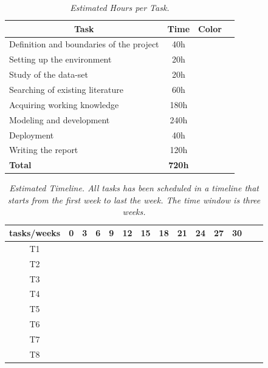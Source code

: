 \begin{table}[H]
\centering
\begin{tabular}{| l | c | c | c |}
\hline
\multicolumn{1}{|c|}{\textbf{Task}} & \multicolumn{1}{c|}{\textbf{Time}} & \multicolumn{1}{c|}{\textbf{Color}} \\
\hline
Definition and boundaries of the project & 40h & \cellcolor{red!50} \\
\hline
Setting up the environment & 20h & \cellcolor{lime!50} \\
\hline
Study of the data-set & 20h & \cellcolor{blue!40} \\
\hline
Searching of existing literature & 60h & \cellcolor{teal!50} \\
\hline
Acquiring working knowledge & 180h & \cellcolor{amber!30} \\
\hline
Modeling and development & 240h & \cellcolor{black!70} \\
\hline
Deployment & 40h & \cellcolor{gray!50} \\
\hline
Writing the report & 120h & \cellcolor{orange!50} \\
\hline
\textbf{Total} & \textbf{720h} & \\
\hline
\end{tabular}
\caption[Estimated Hours per Task.]{\textit{Estimated Hours per Task.}}
{\label{table:timeline_tasks}}
\end{table}

\begin{table}[H]
\centering
\label{tab:340W}
\begin{tabular}{| c | c | c | c |c | c | c |c | c | c |c | c | c |c | }
\hline
tasks/weeks & 0 & 3 & 6 & 9 & 12 & 15 & 18 & 21 & 24 & 27 & 30 \\
\hline
T1  & \cellcolor{red!50} &   &   &   &   &   &   &   &   &   &     \\
\hline
T2  &   & \cellcolor{lime!50}  &  &  &   &   &   &    &  &  &   \\
\hline
T3  &  &  & \cellcolor{blue!40} &  &   &   &   &   &  &  & \\
\hline
T4  &  &  &  & \cellcolor{teal!50} & \cellcolor{teal!50} &  &  &   &   &   &   \\
\hline
T5  &  &  &  &  & \cellcolor{amber!30} & \cellcolor{amber!30} & \cellcolor{amber!30}  & \cellcolor{amber!30} & \cellcolor{amber!30}  &  & \\
\hline
T6  &  &  &  &  & \cellcolor{black!70} & \cellcolor{black!70} & \cellcolor{black!70}  & \cellcolor{black!70} & \cellcolor{black!70}  &  \cellcolor{black!70} & \\
\hline
T7  &   &  &  &  &  &  &  &   &    & \cellcolor{gray!50} & \\
\hline
T8  &   &  &  &  &  & \cellcolor{orange!50}  &  &   &   & \cellcolor{orange!50} & \cellcolor{orange!50} \\
\hline
\end{tabular}
\caption[Estimated Timeline.] {\textit{Estimated Timeline. All tasks has been scheduled in a timeline that starts from the first week to last the week. The time window is three weeks.}}
\end{table}
